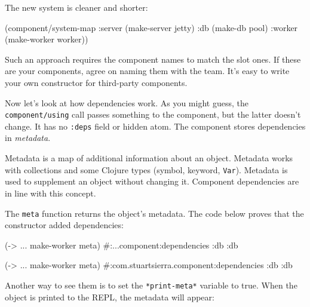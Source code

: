 \fi

\noindent
The new system is cleaner and shorter:

\begin{english}
  \begin{clojure}
(component/system-map
 :server (make-server jetty)
 :db     (make-db pool)
 :worker (make-worker worker))
  \end{clojure}
\end{english}

Such an approach requires the component names to match the slot ones. If these are your components, agree on naming them with the team. It's easy to write your own constructor for third-party components.


Now let's look at how dependencies work. As you might guess, the \verb|component/using| call passes something to the component, but the latter doesn't change. It has no \verb|:deps| field or hidden atom. The component stores dependencies in \emph{metadata}.

Metadata is a map of additional information about an object. Metadata works with collections and some Clojure types (symbol, keyword, \verb|Var|). Metadata is used to supplement an object without changing it. Component dependencies are in line with this concept.

The \verb|meta| function returns the object's metadata. The code below proves that the constructor added dependencies:

\ifnarrow

\begin{english}
  \begin{clojure}
(-> {...} make-worker meta)
#:...component{:dependencies {:db :db}}
  \end{clojure}
\end{english}

\else

\begin{english}
  \begin{clojure}
(-> {...} make-worker meta)
#:com.stuartsierra.component{:dependencies {:db :db}}
  \end{clojure}
\end{english}

\fi

Another way to see them is to set the \verb|*print-meta*| variable to true. When the object is printed to the REPL, the metadata will appear:



